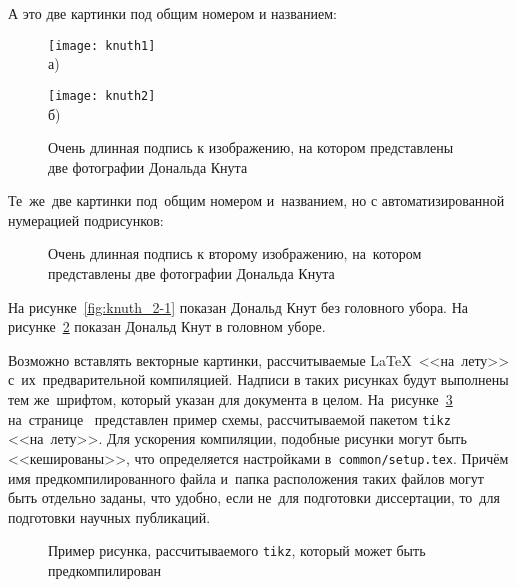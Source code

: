 А это две картинки под общим номером и названием:
\begin{figure}[ht]
	\begin{minipage}[ht]{0.49\linewidth}\centering
		\texttt{[image: knuth1]} \\ а)
	\end{minipage}
	\hfill
	\begin{minipage}[ht]{0.49\linewidth}\centering
		\texttt{[image: knuth2]} \\ б)
	\end{minipage}
	\caption{Очень длинная подпись к изображению,
		на котором представлены две фотографии Дональда Кнута}
	\label{fig:knuth}
\end{figure}

Те~же~две картинки под~общим номером и~названием,
но с автоматизированной нумерацией подрисунков:
\begin{figure}[ht]
	{\centering
		\hfill
		\hfill
		\hfill
		\hfill
	}
	\caption[Этот текст попадает в названия рисунков в списке рисунков]{Очень
		длинная подпись к второму изображению, на~котором представлены две
		фотографии Дональда Кнута}
	\label{fig:knuth_2}
\end{figure}

На рисунке~\ref{fig:knuth_2-1} показан Дональд Кнут без головного убора.
На рисунке~\ref{fig:knuth_2}
показан Дональд Кнут в головном уборе.

Возможно вставлять векторные картинки, рассчитываемые \LaTeX\ <<на~лету>>
с~их~предварительной компиляцией. Надписи в таких рисунках будут выполнены
тем же~шрифтом, который указан для документа в целом.
На~рисунке~\ref{fig:tikz_example} на~странице~\pageref{fig:tikz_example}
представлен пример схемы, рассчитываемой пакетом \verb|tikz| <<на~лету>>.
Для ускорения компиляции, подобные рисунки могут быть <<кешированы>>, что
определяется настройками в~\verb|common/setup.tex|.
Причём имя предкомпилированного
файла и~папка расположения таких файлов могут быть отдельно заданы,
что удобно, если не~для подготовки диссертации,
то~для подготовки научных публикаций.
\begin{figure}[ht]
	{\centering
		
		
	}
	\legend{}
	\caption[Пример \texttt{tikz} схемы]{Пример рисунка, рассчитываемого
		\texttt{tikz}, который может быть предкомпилирован}
	\label{fig:tikz_example}
\end{figure}

